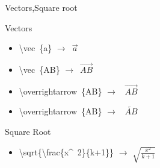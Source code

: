 \documentclass{beamer}
\begin{document}
\begin{frame}{Vectors,Square root}
\begin{block}{Vectors}
\begin{itemize}
\pause \item \textbackslash vec~\{a\} $\rightarrow$~$\vec{a}$
\pause \item \textbackslash vec~\{AB\} $\rightarrow$~$\vec{AB}$
\pause \item \textbackslash overrightarrow~\{AB\} $\rightarrow$~ $\overrightarrow{AB}$ \\
\pause \item \textbackslash overrightarrow~\{AB\} $\rightarrow$~ $\overleftarrow{AB}$
\end{itemize}
\end{block}
\begin{block}{Square Root}
\begin{itemize}
\pause \item \textbackslash sqrt\{\textbackslash frac\{x\^~2\}\{k+1\}\} $\rightarrow$ $\sqrt{\frac{x^2}{k+1}}$
\end{itemize}
\end{block}
\end{frame}
\end{document}
